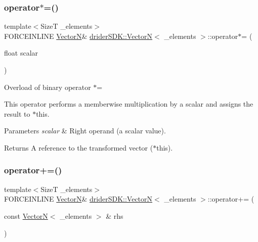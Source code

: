 \subsubsection{\texorpdfstring{operator$\ast$=()}{operator*=()}}
{\footnotesize\ttfamily template$<$SizeT \+\_\+elements$>$ \\
F\+O\+R\+C\+E\+I\+N\+L\+I\+NE \hyperlink{classdrider_s_d_k_1_1_vector_n}{VectorN}\& \hyperlink{classdrider_s_d_k_1_1_vector_n}{drider\+S\+D\+K\+::\+VectorN}$<$ \+\_\+elements $>$\+::operator$\ast$= (\begin{DoxyParamCaption}\item[{float}]{scalar }\end{DoxyParamCaption})\hspace{0.3cm}{\ttfamily [inline]}}

Overload of binary operator $\ast$=

This operator performs a memberwise multiplication by a scalar and assigns the result to $\ast$this.


\begin{DoxyParams}{Parameters}
{\em scalar} & Right operand (a scalar value).\\
\hline
\end{DoxyParams}
\begin{DoxyReturn}{Returns}
A reference to the transformed vector ($\ast$this). 
\end{DoxyReturn}
\mbox{\label{classdrider_s_d_k_1_1_vector_n_aeced03636e133a2622be3440ae01af63}} 
\subsubsection{\texorpdfstring{operator+=()}{operator+=()}}
{\footnotesize\ttfamily template$<$SizeT \+\_\+elements$>$ \\
F\+O\+R\+C\+E\+I\+N\+L\+I\+NE \hyperlink{classdrider_s_d_k_1_1_vector_n}{VectorN}\& \hyperlink{classdrider_s_d_k_1_1_vector_n}{drider\+S\+D\+K\+::\+VectorN}$<$ \+\_\+elements $>$\+::operator+= (\begin{DoxyParamCaption}\item[{const \hyperlink{classdrider_s_d_k_1_1_vector_n}{VectorN}$<$ \+\_\+elements $>$ \&}]{rhs }\end{DoxyParamCaption})\hspace{0.3cm}{\ttfamily [inline]}}

